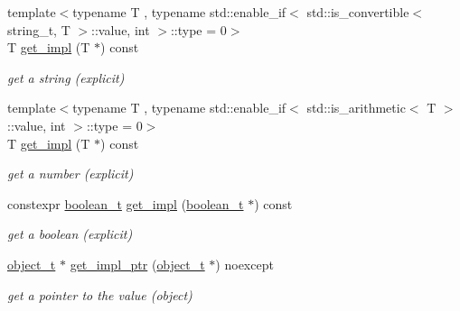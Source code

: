 \begin{DoxyCompactItemize}
{\footnotesize template$<$typename T , typename std\+::enable\+\_\+if$<$ std\+::is\+\_\+convertible$<$ string\+\_\+t, T $>$\+::value, int $>$\+::type  = 0$>$ }\\T \hyperlink{classnlohmann_1_1basic__json_a36a2849d28e6e2aba2cc4d1c962e4682}{get\+\_\+impl} (T $\ast$) const
\begin{DoxyCompactList}\small\item\em get a string (explicit) \end{DoxyCompactList}\item 
\hypertarget{classnlohmann_1_1basic__json_a36a2849d28e6e2aba2cc4d1c962e4682}{}\label{classnlohmann_1_1basic__json_a36a2849d28e6e2aba2cc4d1c962e4682} 
{\footnotesize template$<$typename T , typename std\+::enable\+\_\+if$<$ std\+::is\+\_\+arithmetic$<$ T $>$\+::value, int $>$\+::type  = 0$>$ }\\T \hyperlink{classnlohmann_1_1basic__json_a36a2849d28e6e2aba2cc4d1c962e4682}{get\+\_\+impl} (T $\ast$) const
\begin{DoxyCompactList}\small\item\em get a number (explicit) \end{DoxyCompactList}\item 
\hypertarget{classnlohmann_1_1basic__json_a296af4dd038bdce044ced4b232729b1b}{}\label{classnlohmann_1_1basic__json_a296af4dd038bdce044ced4b232729b1b} 
constexpr \hyperlink{classnlohmann_1_1basic__json_af3bc3e83aa162d7ba4df16a949872723}{boolean\+\_\+t} \hyperlink{classnlohmann_1_1basic__json_a296af4dd038bdce044ced4b232729b1b}{get\+\_\+impl} (\hyperlink{classnlohmann_1_1basic__json_af3bc3e83aa162d7ba4df16a949872723}{boolean\+\_\+t} $\ast$) const
\begin{DoxyCompactList}\small\item\em get a boolean (explicit) \end{DoxyCompactList}\item 
\hypertarget{classnlohmann_1_1basic__json_a5f75d46143bc6eb4d19faf0a1e168deb}{}\label{classnlohmann_1_1basic__json_a5f75d46143bc6eb4d19faf0a1e168deb} 
\hyperlink{classnlohmann_1_1basic__json_a0ac9894c9de8dc551cf2e5f1c605537f}{object\+\_\+t} $\ast$ \hyperlink{classnlohmann_1_1basic__json_a5f75d46143bc6eb4d19faf0a1e168deb}{get\+\_\+impl\+\_\+ptr} (\hyperlink{classnlohmann_1_1basic__json_a0ac9894c9de8dc551cf2e5f1c605537f}{object\+\_\+t} $\ast$) noexcept
\begin{DoxyCompactList}\small\item\em get a pointer to the value (object) \end{DoxyCompactList}\item 

\end{DoxyCompactItemize}
